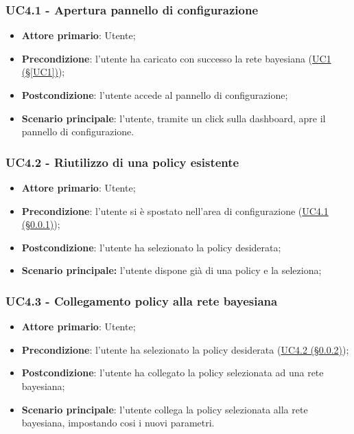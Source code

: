 \subsubsection{UC4.1 - Apertura pannello di configurazione}\label{UC4.1}
\begin{itemize}
	\item \textbf{Attore primario}: Utente; 
	\item \textbf{Precondizione}: l'utente ha caricato con successo la rete bayesiana (\hyperref[UC1]{UC1 (§\ref*{UC1})});
	\item \textbf{Postcondizione}: l'utente accede al pannello di configurazione;
	\item \textbf{Scenario principale}: l'utente, tramite un click sulla dashboard, apre il pannello di configurazione. 
\end{itemize}

\subsubsection{UC4.2 - Riutilizzo di una policy esistente}\label{UC4.2}

\begin{itemize}
	\item \textbf{Attore primario}: Utente; 
	\item \textbf{Precondizione}: l'utente si è spostato nell'area di configurazione (\hyperref[UC4.1]{UC4.1 (§\ref*{UC4.1})});
	\item \textbf{Postcondizione}: l'utente ha selezionato la policy desiderata;
	\item \textbf{Scenario principale:} l'utente dispone già di una policy e la seleziona; 
\end{itemize}

\subsubsection{UC4.3 - Collegamento policy alla rete bayesiana}\label{UC4.3}
\begin{itemize}
	\item \textbf{Attore primario}: Utente; 
	\item \textbf{Precondizione}: l'utente ha selezionato la policy desiderata (\hyperref[UC4.2]{UC4.2 (§\ref*{UC4.2})});
	\item \textbf{Postcondizione}: l'utente ha collegato la policy selezionata ad una rete bayesiana; 
	\item \textbf{Scenario principale}: l'utente collega la policy selezionata alla rete bayesiana, impostando cosi i nuovi parametri. 
\end{itemize}

